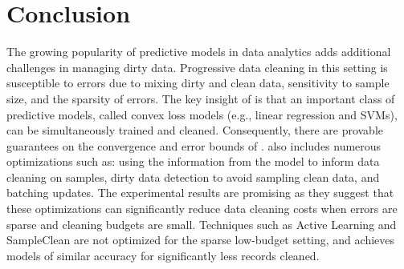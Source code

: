
\section{Conclusion}
The growing popularity of predictive models in data analytics adds additional challenges in managing dirty data.
Progressive data cleaning in this setting is susceptible to errors due to mixing dirty and clean data, sensitivity to sample size, and the sparsity of errors.
The key insight of \sys is that an important class of predictive models, called convex loss models (e.g., linear regression and SVMs), can be simultaneously trained and cleaned.
Consequently, there are provable guarantees on the convergence and error bounds of \sys.  
\sys also includes numerous optimizations such as: using the information from the model to inform data cleaning on samples, dirty data detection to avoid sampling clean data, and batching updates.
The experimental results are promising as they suggest that these optimizations can significantly reduce data cleaning costs when errors are sparse and cleaning budgets are small.
Techniques such as Active Learning and SampleClean are not optimized for the sparse low-budget setting, and \sys achieves models of similar accuracy for significantly less records cleaned.

\vspace{1em}